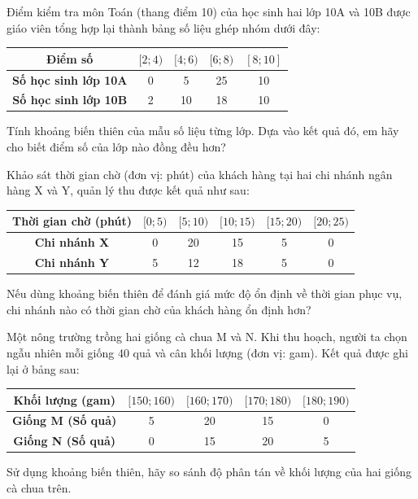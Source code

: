 \documentclass[12pt]{article}
\begin{document}
	\begin{btxanh}[title={Bài 2}]
		Điểm kiểm tra môn Toán (thang điểm 10) của học sinh hai lớp 10A và 10B được giáo viên tổng hợp lại thành bảng số liệu ghép nhóm dưới đây:
		\begin{center}
			\renewcommand{\arraystretch}{1.3}
			\begin{tabular}{|c|c|c|c|c|}
				\hline
				\textbf{Điểm số} & $[2; 4)$ & $[4; 6)$ & $[6; 8)$ & $[8; 10]$ \\
				\hline
				\textbf{Số học sinh lớp 10A} & 0 & 5 & 25 & 10 \\
				\hline
				\textbf{Số học sinh lớp 10B} & 2 & 10 & 18 & 10 \\
				\hline
			\end{tabular}
		\end{center}
		Tính khoảng biến thiên của mẫu số liệu từng lớp. Dựa vào kết quả đó, em hãy cho biết điểm số của lớp nào đồng đều hơn?
	\end{btxanh}
	
	\begin{btvang}[title={Bài 3}]
		Khảo sát thời gian chờ (đơn vị: phút) của khách hàng tại hai chi nhánh ngân hàng X và Y, quản lý thu được kết quả như sau:
		\begin{center}
			\renewcommand{\arraystretch}{1.3}
			\begin{tabular}{|c|c|c|c|c|c|}
				\hline
				\textbf{Thời gian chờ (phút)} & $[0; 5)$ & $[5; 10)$ & $[10; 15)$ & $[15; 20)$ & $[20; 25)$ \\
				\hline
				\textbf{Chi nhánh X} & 0 & 20 & 15 & 5 & 0 \\
				\hline
				\textbf{Chi nhánh Y} & 5 & 12 & 18 & 5 & 0 \\
				\hline
			\end{tabular}
		\end{center}
		Nếu dùng khoảng biến thiên để đánh giá mức độ ổn định về thời gian phục vụ, chi nhánh nào có thời gian chờ của khách hàng ổn định hơn?
	\end{btvang}
	
	\begin{btvang}[title={Bài 4}]
		Một nông trường trồng hai giống cà chua M và N. Khi thu hoạch, người ta chọn ngẫu nhiên mỗi giống 40 quả và cân khối lượng (đơn vị: gam). Kết quả được ghi lại ở bảng sau:
		\begin{center}
			\renewcommand{\arraystretch}{1.3}
			\begin{tabular}{|c|c|c|c|c|}
				\hline
				\textbf{Khối lượng (gam)} & $[150; 160)$ & $[160; 170)$ & $[170; 180)$ & $[180; 190)$ \\
				\hline
				\textbf{Giống M (Số quả)} & 5 & 20 & 15 & 0 \\
				\hline
				\textbf{Giống N (Số quả)} & 0 & 15 & 20 & 5 \\
				\hline
			\end{tabular}
		\end{center}
		Sử dụng khoảng biến thiên, hãy so sánh độ phân tán về khối lượng của hai giống cà chua trên.
	\end{btvang}
	
\end{document}
